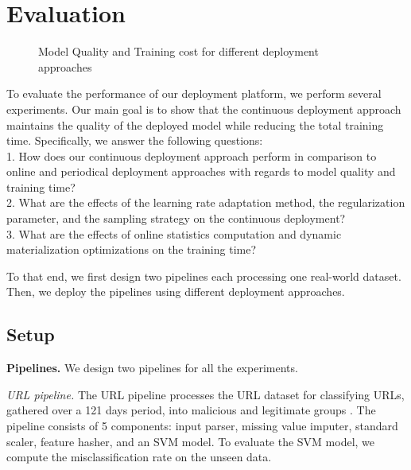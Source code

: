 \section{Evaluation} \label{evaluation} 
\begin{figure*}[t]
\centering
\resizebox{\textwidth}{!}{}
\caption{Model Quality and Training cost for different deployment approaches}
 \vspace{-10pt}
\label{deployment-quality-figure}
\end{figure*}
To evaluate the performance of our deployment platform, we perform several experiments.
Our main goal is to show that the continuous deployment approach maintains the quality of the deployed model while reducing the total training time.
Specifically, we answer the following questions:\\
1. How does our continuous deployment approach perform in comparison to online and periodical deployment approaches with regards to model quality and training time? \\
2. What are the effects of the learning rate adaptation method, the regularization parameter, and the sampling strategy on the continuous deployment? \\
3. What are the effects of online statistics computation and dynamic materialization optimizations on the training time?

To that end, we first design two pipelines each processing one real-world dataset.
Then, we deploy the pipelines using different deployment approaches.
\subsection{Setup}\label{subsec:setup}
\textbf{Pipelines.}
We design two pipelines for all the experiments.

\textit{URL pipeline.} The URL pipeline processes the URL dataset for classifying URLs, gathered over a 121 days period, into malicious and legitimate groups \cite{ma2009identifying}.
The pipeline consists of 5 components: input parser, missing value imputer, standard scaler, feature hasher, and an SVM model.
To evaluate the SVM model, we compute the misclassification rate on the unseen data.

